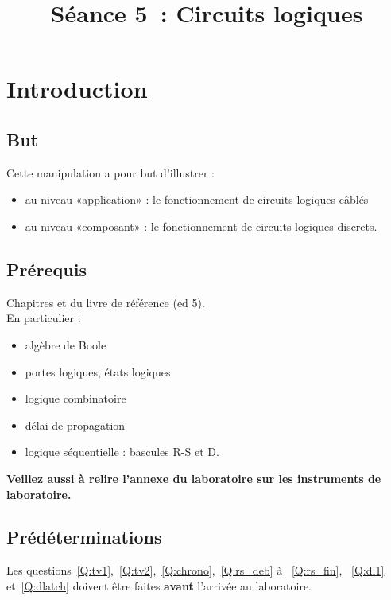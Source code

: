\documentclass[11pt,a4paper]{article}
\date{}
\title{Séance 5~: Circuits logiques\ifthenelse{\boolean{corrige}}{~\\Corrigé}{}}
\theoremstyle{definition}%
\begin{document}
\pagestyle{fancy}
\maketitle
\vspace*{-1cm}
\section{Introduction}

\subsection{But}
Cette manipulation a pour but d'illustrer :
\begin{itemize}
\item au niveau «application» : le fonctionnement de circuits logiques câblés
\item au niveau «composant» : le fonctionnement de circuits logiques discrets.
\end{itemize}

\subsection{Prérequis}
Chapitres  et   du livre de référence (ed 5).\\ En particulier :
\begin{itemize}
\item algèbre de Boole
\item portes logiques, états logiques
\item logique combinatoire
\item délai de propagation
\item logique séquentielle : bascules R-S et D.
\end{itemize}

\textbf{Veillez aussi à relire l'annexe du laboratoire  sur les instruments de laboratoire.}


\subsection{Prédéterminations}
Les questions~\ref{Q:tv1},~\ref{Q:tv2},~\ref{Q:chrono},~\ref{Q:rs_deb} à ~\ref{Q:rs_fin}, ~\ref{Q:dl1} et~\ref{Q:dlatch} doivent être faites \textbf{avant} l'arrivée au laboratoire.
\end{document}
